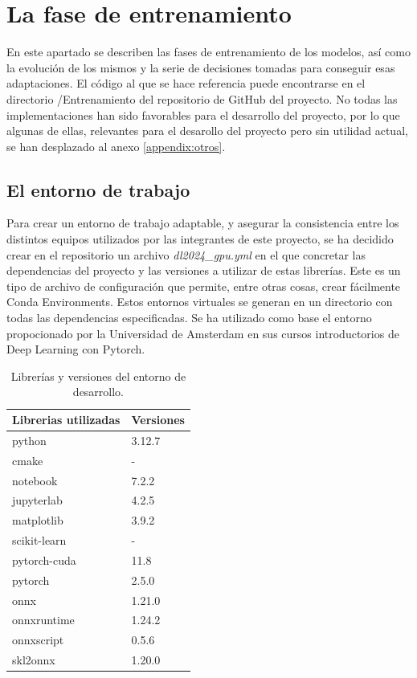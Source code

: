 \section{La fase de entrenamiento}
\label{sec:EntrenamientoPython}

En este apartado se describen las fases de entrenamiento de los modelos, así como la evolución de los mismos y la serie de decisiones tomadas para conseguir esas adaptaciones. El código al que se hace referencia puede encontrarse en el directorio /Entrenamiento del repositorio de GitHub del proyecto. No todas las implementaciones han sido favorables para el desarrollo del proyecto, por lo que algunas de ellas, relevantes para el desarollo del proyecto pero sin utilidad actual, se han desplazado al anexo \ref{appendix:otros}.

\subsection{El entorno de trabajo}

Para crear un entorno de trabajo adaptable, y asegurar la consistencia entre los distintos equipos utilizados por las integrantes de este proyecto, se ha decidido crear en el repositorio un archivo \textit{dl2024\_gpu.yml} en el que concretar las dependencias del proyecto y las versiones a utilizar de estas librerías. Este es un tipo de archivo de configuración que permite, entre otras cosas, crear fácilmente Conda Environments. Estos entornos virtuales se generan en un directorio con todas las dependencias especificadas. Se ha utilizado como base el entorno propocionado por la Universidad de Amsterdam en sus cursos introductorios de Deep Learning con Pytorch.
\begin{table}[H]
    \begin{center}
        \begin{tabular}{ | m{4cm} | m{2cm} | }
        \hline Librerias utilizadas & Versiones \\ \hline
            python & 3.12.7 \\ \hline
            cmake & - \\ \hline
            notebook & 7.2.2 \\ \hline 
            jupyterlab & 4.2.5 \\ \hline 
            matplotlib & 3.9.2 \\ \hline 
            scikit-learn & - \\ \hline
            pytorch-cuda & 11.8 \\ \hline
            pytorch & 2.5.0 \\ \hline
            onnx & 1.21.0 \\ \hline
            onnxruntime & 1.24.2 \\ \hline
            onnxscript & 0.5.6 \\ \hline
            skl2onnx & 1.20.0 \\ \hline
        \end{tabular}
    \end{center}
    \caption{Librerías y versiones del entorno de desarrollo.}
\end{table}

